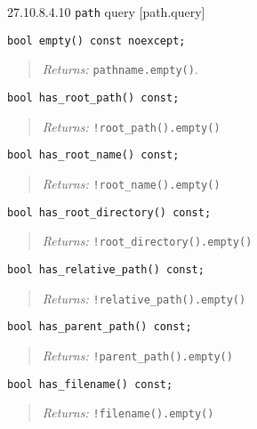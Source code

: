 27.10.8.4.10 \texttt{path} query {[}path.query{]}

\begin{verbatim}
bool empty() const noexcept;
\end{verbatim}

\begin{quote}
\emph{Returns:} \texttt{pathname.empty()}.
\end{quote}

\begin{verbatim}
bool has_root_path() const;
\end{verbatim}

\begin{quote}
\emph{Returns:} \texttt{!root\_path().empty()}
\end{quote}

\begin{verbatim}
bool has_root_name() const;
\end{verbatim}

\begin{quote}
\emph{Returns:} \texttt{!root\_name().empty()}
\end{quote}

\begin{verbatim}
bool has_root_directory() const;
\end{verbatim}

\begin{quote}
\emph{Returns:} \texttt{!root\_directory().empty()}
\end{quote}

\begin{verbatim}
bool has_relative_path() const;
\end{verbatim}

\begin{quote}
\emph{Returns:} \texttt{!relative\_path().empty()}
\end{quote}

\begin{verbatim}
bool has_parent_path() const;
\end{verbatim}

\begin{quote}
\emph{Returns:} \texttt{!parent\_path().empty()}
\end{quote}

\begin{verbatim}
bool has_filename() const;
\end{verbatim}

\begin{quote}
\emph{Returns:} \texttt{!filename().empty()}
\end{quote}


